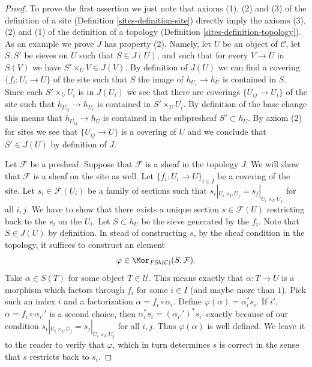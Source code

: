 \begin{proof}

To prove the first assertion we just note that axioms
(1), (2) and (3) of the definition of a site
(Definition \ref{sites-definition-site})
directly imply the axioms
(3), (2) and (1) of the definition of a topology
(Definition \ref{sites-definition-topology}). As an example we
prove $J$ has property (2). Namely, let $U$ be an object
of $\mathcal{C}$, let $S, S'$ be sieves on $U$ such that
$S \in J(U)$, and such that for every $V \to U$ in $S(V)$
we have $S' \times_U V \in J(V)$. By definition of $J(U)$
we can find a covering $\{f_i : U_i \to U\}$ of the site
such that $S$ the image of $h_{U_i} \to h_U$ is contained
in $S$. Since each $S'\times_U U_i$ is in $J(U_i)$ we
see that there are coverings $\{U_{ij} \to U_i\}$ of the
site such that $h_{U_{ij}} \to h_{U_i}$ is contained
in $S' \times_U U_i$. By definition of the base change
this means that $h_{U_{ij}} \to h_U$ is contained
in the subpresheaf $S' \subset h_U$. By axiom (2) for
sites we see that $\{U_{ij} \to U\}$ is a covering of
$U$ and we conclude that $S' \in J(U)$ by definition of $J$.

\medskip\noindent
Let $\mathcal{F}$ be a presheaf. Suppose that $\mathcal{F}$
is a sheaf in the topology $J$. We will show that $\mathcal{F}$
is a sheaf on the site as well. Let $\{f_i : U_i \to U\}_{i\in I}$
be a covering of the site. Let $s_i \in \mathcal{F}(U_i)$ be a
family of sections such that
$s_i|_{U_i \times_U U_j} = s_j|_{U_i \times_U U_j}$ for all
$i, j$. We have to show that there exists a unique section
$s \in \mathcal{F}(U)$ restricting back to the $s_i$ on the $U_i$.
Let $S \subset h_U$ be the sieve generated by the $f_i$.
Note that $S \in J(U)$ by definition. In stead of constructing
$s$, by the sheaf condition in the topology, it suffices
to construct an element
$$
\varphi \in \Mor_{\textit{PSh}(\mathcal{C})}(S, \mathcal{F}).
$$
Take $\alpha \in S(T)$ for some object $T \in \mathcal{U}$.
This means exactly that $\alpha : T \to U$ is a morphism
which factors through $f_i$ for some $i\in I$ (and maybe more than $1$).
Pick such an index $i$ and a factorization $\alpha = f_i \circ \alpha_i$.
Define $\varphi(\alpha) = \alpha_i^* s_i$. If $i'$, $\alpha
= f_i \circ \alpha_{i'}'$ is a second choice, then
$\alpha_i^* s_i = (\alpha_{i'}')^* s_{i'}$ exactly because of our
condition $s_i|_{U_i \times_U U_j} = s_j|_{U_i \times_U U_j}$ for all
$i, j$. Thus $\varphi(\alpha)$ is well defined. We leave it to the reader
to verify that $\varphi$, which in turn determines $s$ is correct
in the sense that $s$ restricts back to $s_i$.


\end{proof}
